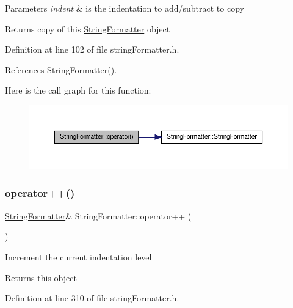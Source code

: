 \begin{DoxyParams}{Parameters}
{\em indent} & is the indentation to add/subtract to copy \\
\hline
\end{DoxyParams}
\begin{DoxyReturn}{Returns}
copy of this \hyperlink{classStringFormatter}{String\+Formatter} object 
\end{DoxyReturn}


Definition at line 102 of file string\+Formatter.\+h.



References String\+Formatter().

Here is the call graph for this function\+:
\nopagebreak
\begin{figure}[H]
\begin{center}
\leavevmode
\includegraphics[width=350pt]{classStringFormatter_aa60790b08f6f3c4a1cbf5e3dec0a8895_cgraph}
\end{center}
\end{figure}
\mbox{\label{classStringFormatter_ae5e113c66eac2e99743eb3ce75bb9b12}} 
\subsubsection{\texorpdfstring{operator++()}{operator++()}}
{\footnotesize\ttfamily \hyperlink{classStringFormatter}{String\+Formatter}\& String\+Formatter\+::operator++ (\begin{DoxyParamCaption}{ }\end{DoxyParamCaption})\hspace{0.3cm}{\ttfamily [inline]}}

Increment the current indentation level \begin{DoxyReturn}{Returns}
this object 
\end{DoxyReturn}


Definition at line 310 of file string\+Formatter.\+h.

\mbox{\label{classStringFormatter_adb0e8aad266a4a8f68a6ff6db7dbe231}} 
